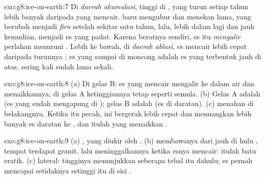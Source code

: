 \begin{solution}{exo:g8:ice-on-earth:7}
Di \emph{daerah akumulasi}, tinggi di ,  yang turun setiap
tahun lebih banyak daripada yang mencair.  baru mengubur dan menekan
 lama, yang berubah menjadi \emph{firn} setelah sekitar satu tahun,
lalu, lebih dalam lagi dan jauh kemudian, menjadi es yang padat. Karena
beratnya sendiri, es itu \emph{mengalir} perlahan menuruni . Lebih
ke bawah, di \emph{daerah ablasi}, es mencair lebih cepat daripada
turunnya ; es yang sampai di moncong adalah es yang terbentuk jauh di
atas, sering kali sudah lama sekali.
\end{solution}

\begin{solution}{exo:g8:ice-on-earth:8}
(a) Di gelas B: es yang mencair mengalir ke dalam air dan menaikkannya; di
gelas A ketinggiannya tetap seperti semula. (b) Gelas A adalah 
(es yang sudah mengapung di ); gelas B adalah  (es di
daratan). (c)  menahan  di belakangnya. Ketika
 itu pecah,  ini bergerak lebih cepat dan
menuangkan lebih banyak es daratan ke , dan itulah yang menaikkan
.
\end{solution}

\begin{solution}{exo:g8:ice-on-earth:9}
(a) , yang diukir oleh . (b)  membawanya
dari jauh di hulu , tempat terdapat granit, lalu meninggalkannya
ketika esnya mencair: itulah batu eratik. (c)  lateral: tingginya
menunjukkan seberapa tebal  itu dahulu; es pernah mencapai
setidaknya setinggi itu di sisi .
\end{solution}

